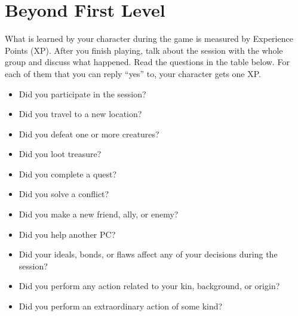 \section{Beyond First Level} \label{sec::beyondfirstlevel}

%
%
%


What is learned by your character during the game is measured by Experience Points (XP).
After you finish playing, talk about the session with the whole group and discuss what happened.
Read the questions in the table below.
For each of them that you can reply ``yes'' to, your character gets one XP.

\begin{itemize}
    \item Did you participate in the session?
    \item Did you travel to a new location?
    \item Did you defeat one or more creatures?
    \item Did you loot treasure?
    \item Did you complete a quest?
    \item Did you solve a conflict?
    \item Did you make a new friend, ally, or enemy?
    \item Did you help another PC?
    \item Did your ideals, bonds, or flaws affect any of your decisions during the session?
    \item Did you perform any action related to your kin, background, or origin?
    \item Did you perform an extraordinary action of some kind?
\end{itemize}

